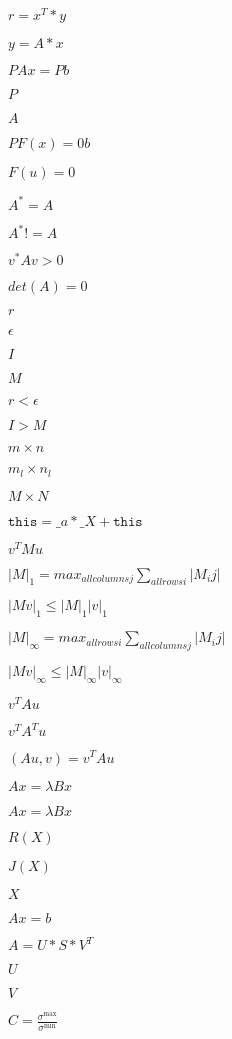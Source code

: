 \documentclass{article}
\begin{document}
$ r = x^T * y $
\pagebreak

$ y = A * x $
\pagebreak

$P A x = P b$
\pagebreak

$P$
\pagebreak

$A$
\pagebreak

$P F(x)=0 b$
\pagebreak

$F( u ) = 0$
\pagebreak

$A^* = A$
\pagebreak

$A^* != A$
\pagebreak

$v^* A v > 0 $
\pagebreak

$det(A)=0$
\pagebreak

$r$
\pagebreak

$\epsilon$
\pagebreak

$I$
\pagebreak

$M$
\pagebreak

$ r < \epsilon $
\pagebreak

$ I > M $
\pagebreak

$ m \times n $
\pagebreak

$ m_l \times n_l $
\pagebreak

$ M \times N $
\pagebreak

$\texttt{this} = \_a*\_X + \texttt{this} $
\pagebreak

$ v^T M u $
\pagebreak

$|M|_1=max_{all columns j}\sum_{all rows i} |M_ij|$
\pagebreak

$|Mv|_1\leq |M|_1 |v|_1$
\pagebreak

$|M|_\infty=max_{all rows i}\sum_{all columns j} |M_ij|$
\pagebreak

$|Mv|_\infty \leq |M|_\infty |v|_\infty$
\pagebreak

$v^T A u$
\pagebreak

$v^T A^T u$
\pagebreak

$(Au, v)= v^T A u$
\pagebreak

$A x =\lambda B x$
\pagebreak

$A x = \lambda Bx$
\pagebreak

$ R(X) $
\pagebreak

$ J(X) $
\pagebreak

$ X $
\pagebreak

$ A x = b $
\pagebreak

$ A = U * S * V^T $
\pagebreak

$ U$
\pagebreak

$ V$
\pagebreak

$ C = \frac{\sigma^\mathrm{max}}{\sigma^\mathrm{min}} $
\pagebreak
\end{document}
